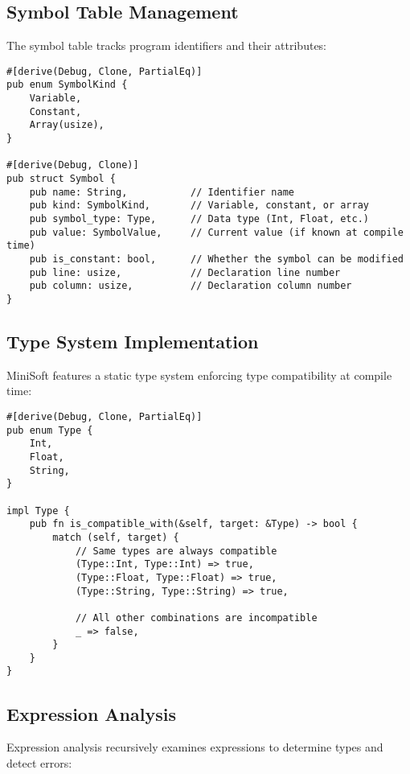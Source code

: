 \documentclass[12pt,a4paper]{article}
\begin{document}
\subsection{Symbol Table Management}
The symbol table tracks program identifiers and their attributes:

\begin{lstlisting}[caption={Symbol Table Structure}]
#[derive(Debug, Clone, PartialEq)]
pub enum SymbolKind {
    Variable,
    Constant,
    Array(usize),
}

#[derive(Debug, Clone)]
pub struct Symbol {
    pub name: String,           // Identifier name
    pub kind: SymbolKind,       // Variable, constant, or array
    pub symbol_type: Type,      // Data type (Int, Float, etc.)
    pub value: SymbolValue,     // Current value (if known at compile time)
    pub is_constant: bool,      // Whether the symbol can be modified
    pub line: usize,            // Declaration line number
    pub column: usize,          // Declaration column number
}
\end{lstlisting}

\subsection{Type System Implementation}
MiniSoft features a static type system enforcing type compatibility at compile time:

\begin{lstlisting}[caption={Type System}]
#[derive(Debug, Clone, PartialEq)]
pub enum Type {
    Int,
    Float,
    String,
}

impl Type {
    pub fn is_compatible_with(&self, target: &Type) -> bool {
        match (self, target) {
            // Same types are always compatible
            (Type::Int, Type::Int) => true,
            (Type::Float, Type::Float) => true,
            (Type::String, Type::String) => true,
            
            // All other combinations are incompatible
            _ => false,
        }
    }
}
\end{lstlisting}

\subsection{Expression Analysis}
Expression analysis recursively examines expressions to determine types and detect errors:
\end{document}
